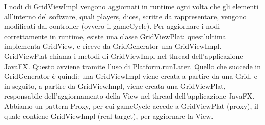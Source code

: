\documentclass[a4paper,12pt]{report}
\begin{document}
I nodi di GridViewImpl vengono aggiornati in runtime ogni volta che gli elementi all’interno del software, quali players, dices, scritte da rappresentare, vengono modificati dal controller (ovvero il gameCycle).
%
Per aggiornare i nodi correttamente in runtime, esiste una classe GridViewPlat: quest'ultima implementa GridView, e riceve da GridGenerator una GridViewImpl.
%
GridViewPlat chiama i metodi di GridViewImpl nel thread dell’applicazione JavaFX.
%
Questo avviene tramite l’uso di Platform.runLater.
%
Quello che succede in GridGenerator è quindi: una GridViewImpl viene creata a partire da una Grid, e in seguito, a partire da GridViewImpl, viene creata una GridViewPlat, responsabile dell’aggiornamento della View nel thread dell’applicazione JavaFX.
%
Abbiamo un pattern Proxy, per cui gameCycle accede a GridViewPlat (proxy), il quale contiene GridViewImpl (real target), per aggiornare la View.
\end{document}
